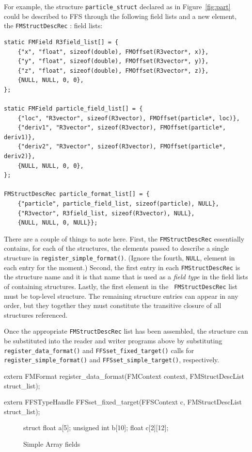 For example, the structure {\tt particle\_struct} declared as in
Figure~\ref{fig:part} could be described to FFS through the following field
lists and a new element, the {\tt FMStructDescRec} :
field lists:
\begin{verbatim}
static FMField R3field_list[] = {
    {"x", "float", sizeof(double), FMOffset(R3vector*, x)},
    {"y", "float", sizeof(double), FMOffset(R3vector*, y)},
    {"z", "float", sizeof(double), FMOffset(R3vector*, z)},
    {NULL, NULL, 0, 0},
};

static FMField particle_field_list[] = {
    {"loc", "R3vector", sizeof(R3vector), FMOffset(particle*, loc)},
    {"deriv1", "R3vector", sizeof(R3vector), FMOffset(particle*, deriv1)},
    {"deriv2", "R3vector", sizeof(R3vector), FMOffset(particle*, deriv2)},
    {NULL, NULL, 0, 0},
};

FMStructDescRec particle_format_list[] = {
    {"particle", particle_field_list, sizeof(particle), NULL},
    {"R3vector", R3field_list, sizeof(R3vector), NULL},
    {NULL, NULL, 0, NULL}};

\end{verbatim}
There are a couple of things to note here.  First, the {\tt FMStructDescRec}
essentially contains, for each of the structures, the elements passed to
describe a single structure in {\tt register\_simple\_format()}.  (Ignore
the fourth, {\tt NULL}, element in each entry for the moment.)  Second, the
first entry in each {\tt FMStructDescRec} is the structure name and it is
that name that is used as a {\em field type} in the field lists of
containing structures.  Lastly, the first element in the {\tt
  FMStructDescRec} list must be top-level structure.  The remaining
structure entries can appear in any order, but they together they must
constitute the transitive closure of all structures referenced.

Once the appropriate {\tt FMStructDescRec} list has been assembled, the
structure can be substituted into the reader and writer programs above by
substituting {\tt register\_data\_format()} and {\tt FFSset\_fixed\_target()}
calls for {\tt register\_simple\_format()} and {\tt FFSset\_simple\_target()},
respectively. 
\begin{Code}
extern FMFormat
register_data_format(FMContext context, FMStructDescList struct_list);

extern FFSTypeHandle
FFSset_fixed_target(FFSContext c, FMStructDescList struct_list);
\end{Code}
\begin{figure}
\vspace*{-0.25in}
\begin{WrapCode}
struct { 
     float	a[5];
     unsigned int b[10];
     float      c[2][12];
 }
\end{WrapCode}
\caption{Simple Array fields\label{fig:array1}}
\end{figure}
